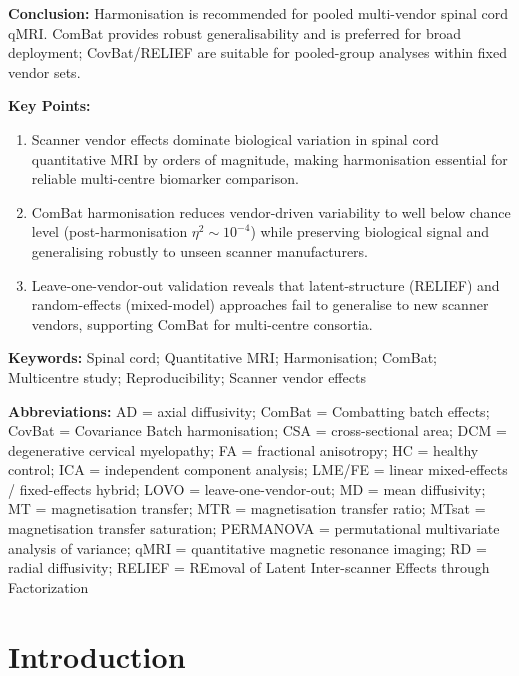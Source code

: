 \documentclass[12pt,a4paper]{article}
\begin{document}
\noindent\textbf{Conclusion:} Harmonisation is recommended for pooled multi-vendor spinal cord qMRI. ComBat provides robust generalisability and is preferred for broad deployment; CovBat/RELIEF are suitable for pooled-group analyses within fixed vendor sets.

\vspace{4mm}
\noindent\textbf{Key Points:}
\begin{enumerate}[nosep,leftmargin=*]
  \item Scanner vendor effects dominate biological variation in spinal cord quantitative MRI by orders of magnitude, making harmonisation essential for reliable multi-centre biomarker comparison.
  \item ComBat harmonisation reduces vendor-driven variability to well below chance level (post-harmonisation $\eta^2\sim10^{-4}$) while preserving biological signal and generalising robustly to unseen scanner manufacturers.
  \item Leave-one-vendor-out validation reveals that latent-structure (RELIEF) and random-effects (mixed-model) approaches fail to generalise to new scanner vendors, supporting ComBat for multi-centre consortia.
\end{enumerate}

\vspace{4mm}
\noindent\textbf{Keywords:} Spinal cord; Quantitative MRI; Harmonisation; ComBat; Multicentre study; Reproducibility; Scanner vendor effects

\vspace{4mm}
\noindent\textbf{Abbreviations:} AD = axial diffusivity; ComBat = Combatting batch effects; CovBat = Covariance Batch harmonisation; CSA = cross-sectional area; DCM = degenerative cervical myelopathy; FA = fractional anisotropy; HC = healthy control; ICA = independent component analysis; LME/FE = linear mixed-effects / fixed-effects hybrid; LOVO = leave-one-vendor-out; MD = mean diffusivity; MT = magnetisation transfer; MTR = magnetisation transfer ratio; MTsat = magnetisation transfer saturation; PERMANOVA = permutational multivariate analysis of variance; qMRI = quantitative magnetic resonance imaging; RD = radial diffusivity; RELIEF = REmoval of Latent Inter-scanner Effects through Factorization

\section{Introduction}
\end{document}
